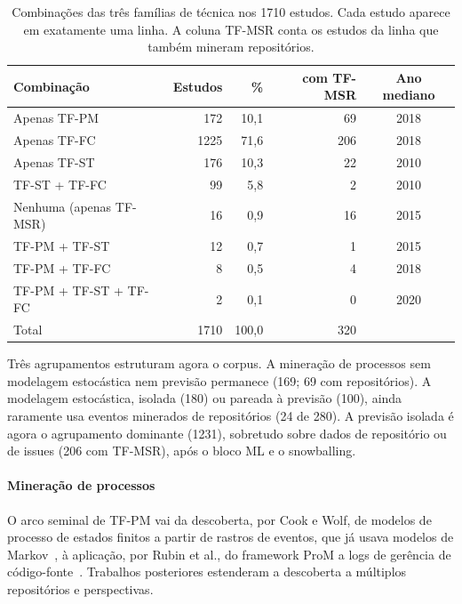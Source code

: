 \documentclass[preprint,12pt,authoryear=false]{elsarticle}
\newcommand{\PM}{TF-PM}
\newcommand{\ST}{TF-ST}
\newcommand{\FC}{TF-FC}
\newcommand{\MSR}{TF-MSR}
\begin{document}
\begin{table}[t]
\centering\small
\caption{Combinações das três famílias de técnica nos 1710 estudos. Cada estudo aparece em exatamente uma linha. A coluna \MSR{} conta os estudos da linha que também mineram repositórios.}\label{tab:combos}
\begin{tabular}{lrrrc}
\toprule
Combinação & Estudos & \% & com \MSR{} & Ano mediano \\
\midrule
Apenas \PM{} & 172 & 10,1 & 69 & 2018 \\
Apenas \FC{} & 1225 & 71,6 & 206 & 2018 \\
Apenas \ST{} & 176 & 10,3 & 22 & 2010 \\
\ST{} + \FC{} & 99 & 5,8 & 2 & 2010 \\
Nenhuma (apenas \MSR{}) & 16 & 0,9 & 16 & 2015 \\
\PM{} + \ST{} & 12 & 0,7 & 1 & 2015 \\
\PM{} + \FC{} & 8 & 0,5 & 4 & 2018 \\
\PM{} + \ST{} + \FC{} & 2 & 0,1 & 0 & 2020 \\
\midrule
Total & 1710 & 100,0 & 320 & \\
\bottomrule
\end{tabular}
\end{table}

Três agrupamentos estruturam agora o corpus. A mineração de processos sem modelagem estocástica nem previsão permanece (169; 69 com repositórios). A modelagem estocástica, isolada (180) ou pareada à previsão (100), ainda raramente usa eventos minerados de repositórios (24 de 280). A previsão isolada é agora o agrupamento dominante (1231), sobretudo sobre dados de repositório ou de issues (206 com \MSR{}), após o bloco ML e o snowballing.

\paragraph{Mineração de processos}
O arco seminal de \PM{} vai da descoberta, por Cook e Wolf, de modelos de processo de estados finitos a partir de rastros de eventos, que já usava modelos de Markov~\cite{cook1995,cook1998}, à aplicação, por Rubin et al., do framework ProM a logs de gerência de código-fonte~\cite{rubin2007}. Trabalhos posteriores estenderam a descoberta a múltiplos repositórios e perspectivas.
\end{document}
